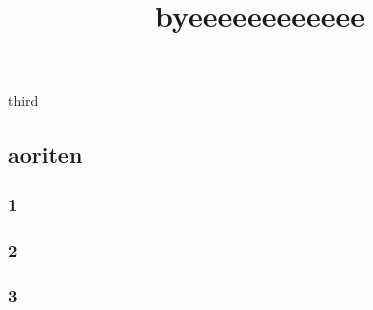 \documentclass{article}
\begin{document}
third
\title{byeeeeeeeeeeee}
\subsection*{aoriten}
\subsubsection*{1}
\subsubsection*{2}
\subsubsection*{3}
\end{document}
